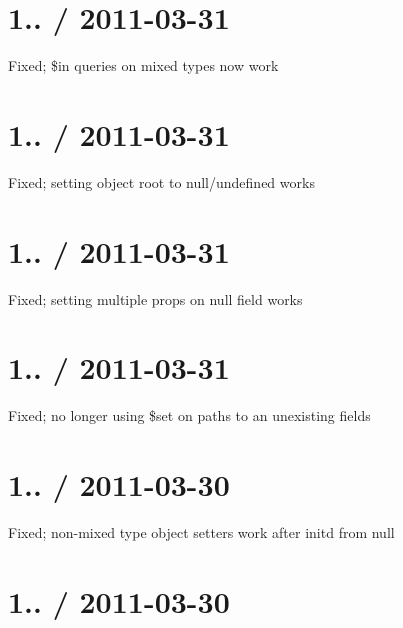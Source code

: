 \section*{1.. / 2011-\/03-\/31 }


\begin{DoxyItemize}
\item Fixed; \$in queries on mixed types now work
\end{DoxyItemize}

\section*{1.. / 2011-\/03-\/31 }


\begin{DoxyItemize}
\item Fixed; setting object root to null/undefined works
\end{DoxyItemize}

\section*{1.. / 2011-\/03-\/31 }


\begin{DoxyItemize}
\item Fixed; setting multiple props on null field works
\end{DoxyItemize}

\section*{1.. / 2011-\/03-\/31 }


\begin{DoxyItemize}
\item Fixed; no longer using \$set on paths to an unexisting fields
\end{DoxyItemize}

\section*{1.. / 2011-\/03-\/30 }


\begin{DoxyItemize}
\item Fixed; non-\/mixed type object setters work after initd from null
\end{DoxyItemize}

\section*{1.. / 2011-\/03-\/30 }


